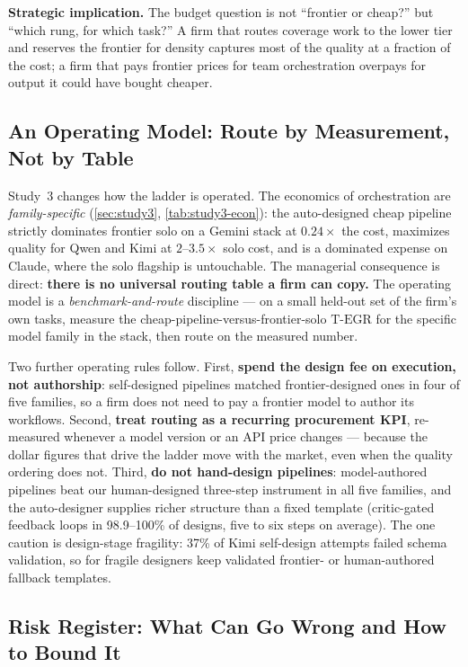 \documentclass[12pt,a4paper]{article}
\newcommand{\TEGR}{\ensuremath{\text{T-EGR}}}
\begin{document}
\noindent\textbf{Strategic implication.} The budget question is not ``frontier or
cheap?'' but ``which rung, for which task?'' A firm that routes coverage work to
the lower tier and reserves the frontier for density captures most of the quality
at a fraction of the cost; a firm that pays frontier prices for team
orchestration overpays for output it could have bought cheaper.

\subsection{An Operating Model: Route by Measurement, Not by Table}

Study~3 changes how the ladder is operated. The economics of orchestration are
\emph{family-specific} (\cref{sec:study3}, \cref{tab:study3-econ}): the
auto-designed cheap pipeline strictly dominates frontier solo on a Gemini stack
at $0.24\times$ the cost, maximizes quality for Qwen and Kimi at $2$--$3.5\times$
solo cost, and is a dominated expense on Claude, where the solo flagship is
untouchable. The managerial consequence is direct: \textbf{there is no universal
routing table a firm can copy.} The operating model is a \emph{benchmark-and-route}
discipline --- on a small held-out set of the firm's own tasks, measure the
cheap-pipeline-versus-frontier-solo $\TEGR$ for the specific model family in the
stack, then route on the measured number.

Two further operating rules follow. First, \textbf{spend the design fee on
execution, not authorship}: self-designed pipelines matched frontier-designed
ones in four of five families, so a firm does not need to pay a frontier model to
author its workflows. Second, \textbf{treat routing as a recurring procurement
KPI}, re-measured whenever a model version or an API price changes --- because the
dollar figures that drive the ladder move with the market, even when the quality
ordering does not. Third, \textbf{do not hand-design pipelines}: model-authored
pipelines beat our human-designed three-step instrument in all five families,
and the auto-designer supplies richer structure than a fixed template
(critic-gated feedback loops in 98.9--100\% of designs, five to six steps on
average). The one caution is design-stage fragility: 37\% of Kimi self-design
attempts failed schema validation, so for fragile designers keep validated
frontier- or human-authored fallback templates.

\subsection{Risk Register: What Can Go Wrong and How to Bound It}
\end{document}

